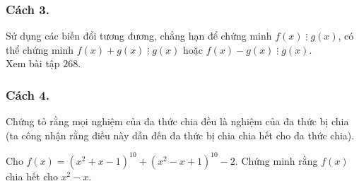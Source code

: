 \subsubsection{Cách 3.}
Sử dụng các biến đổi tương đương, chẳng hạn để chứng minh $f(x)\;\vdots\; g(x)$, có thể chứng minh $f(x)+g(x)\;\vdots \; g(x)$ hoặc $f(x)-g(x)\; \vdots \; g(x)$.\\
Xem bài tập $268$.
\subsubsection{Cách 4.}
Chứng tỏ rằng mọi nghiệm của đa thức chia đều là nghiệm của đa thức bị chia (ta công nhận rằng điều này dẫn đến đa thức bị chia chia hết cho đa thức chia).
\begin{vd}%
	Cho $f(x)=(x^2+x-1)^{10}+(x^2-x+1)^{10}-2$. Chứng minh rằng $f(x)$ chia hết cho $x^2-x$.
\end{vd}

